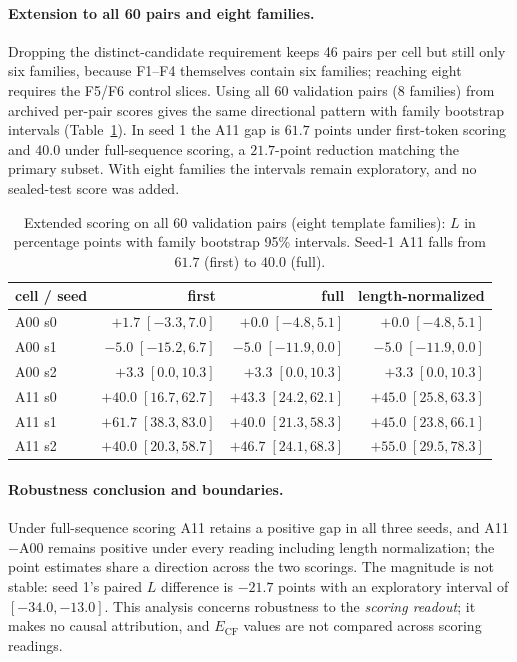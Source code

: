 \documentclass[11pt,a4paper]{article}
\begin{document}
\paragraph{Extension to all 60 pairs and eight families.} Dropping the
distinct-candidate requirement keeps 46 pairs per cell but still only six
families, because F1--F4 themselves contain six families; reaching eight
requires the F5/F6 control slices. Using all 60 validation pairs (8 families)
from archived per-pair scores gives the same directional pattern with family
bootstrap intervals (Table~\ref{tab:allpairs}). In seed 1 the A11 gap is $61.7$
points under first-token scoring and $40.0$ under full-sequence scoring, a
$21.7$-point reduction matching the primary subset. With eight families the
intervals remain exploratory, and no sealed-test score was added.

\begin{table}[t]
\centering
\caption{Extended scoring on all 60 validation pairs (eight template
families): $L$ in percentage points with family bootstrap 95\% intervals.
Seed-1 A11 falls from $61.7$ (first) to $40.0$ (full).}
\label{tab:allpairs}
\begin{tabular}{lrrr}
\toprule
cell / seed & first & full & length-normalized \\
\midrule
A00 s0 & $+1.7\;[-3.3,7.0]$ & $+0.0\;[-4.8,5.1]$ & $+0.0\;[-4.8,5.1]$ \\
A00 s1 & $-5.0\;[-15.2,6.7]$ & $-5.0\;[-11.9,0.0]$ & $-5.0\;[-11.9,0.0]$ \\
A00 s2 & $+3.3\;[0.0,10.3]$ & $+3.3\;[0.0,10.3]$ & $+3.3\;[0.0,10.3]$ \\
A11 s0 & $+40.0\;[16.7,62.7]$ & $+43.3\;[24.2,62.1]$ & $+45.0\;[25.8,63.3]$ \\
A11 s1 & $+61.7\;[38.3,83.0]$ & $+40.0\;[21.3,58.3]$ & $+45.0\;[23.8,66.1]$ \\
A11 s2 & $+40.0\;[20.3,58.7]$ & $+46.7\;[24.1,68.3]$ & $+55.0\;[29.5,78.3]$ \\
\bottomrule
\end{tabular}
\end{table}

\paragraph{Robustness conclusion and boundaries.} Under full-sequence scoring
A11 retains a positive gap in all three seeds, and A11$-$A00 remains positive
under every reading including length normalization; the point estimates share
a direction across the two scorings. The magnitude is not stable: seed 1's
paired $L$ difference is $-21.7$ points with an exploratory interval of
$[-34.0,-13.0]$. This analysis concerns robustness to the \emph{scoring
readout}; it makes no causal attribution, and $E_{\mathrm{CF}}$ values are not
compared across scoring readings.
\end{document}
